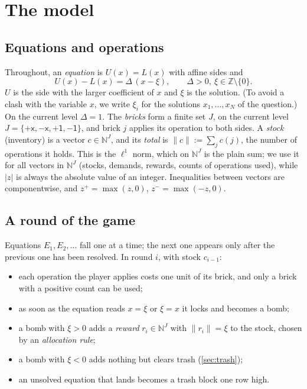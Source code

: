 \documentclass[11pt,a4paper]{article}
\theoremstyle{definition}
\theoremstyle{remark}
\newcommand{\N}{\mathbb{N}}
\newcommand{\Z}{\mathbb{Z}}
\newcommand{\pX}{\ensuremath{\mathord{+}\mathsf{x}}}
\newcommand{\mX}{\ensuremath{\mathord{-}\mathsf{x}}}
\newcommand{\pU}{\ensuremath{\mathord{+}\mathsf{1}}}
\newcommand{\mU}{\ensuremath{\mathord{-}\mathsf{1}}}
\newcommand{\abs}[1]{\lvert #1\rvert}
\newcommand{\norm}[1]{\lVert #1\rVert}
\newcommand{\pos}[1]{{#1}^{+}}
\begin{document}
\section{The model}\label{sec:model}

\subsection{Equations and operations}
Throughout, an \emph{equation} is $U(x)=L(x)$ with affine sides and
\begin{equation}\label{eq:diff}
U(x)-L(x)=\Delta\,(x-\xi),\qquad \Delta>0,\ \xi\in\Z\setminus\{0\}.
\end{equation}
$U$ is the side with the larger coefficient of $x$ and $\xi$ is the solution. (To avoid a
clash with the variable $x$, we write $\xi_i$ for the solutions $x_1,\dots,x_N$ of the
question.) On the current level $\Delta=1$. The \emph{bricks} form a finite set $J$, on
the current level $J=\{\pX,\mX,\pU,\mU\}$, and brick $j$ applies its operation to both
sides. A \emph{stock} (inventory) is a vector $c\in\N^J$, and its \emph{total} is
$\norm{c}:=\sum_j c(j)$, the number of operations it holds. This is the $\ell^1$ norm,
which on $\N^J$ is the plain sum; we use it for all vectors in $\N^J$ (stocks, demands,
rewards, counts of operations used), while $\abs{z}$ is always the absolute value of an
integer.
Inequalities between vectors are componentwise, and $\pos z=\max(z,0)$,
$z^-=\max(-z,0)$.

\subsection{A round of the game}
Equations $E_1,E_2,\dots$ fall one at a time; the next one appears only after the
previous one has been resolved. In round $i$, with stock $c_{i-1}$:
\begin{itemize}[nosep]
\item each operation the player applies costs one unit of its brick, and only a brick with
  a positive count can be used;
\item as soon as the equation reads $x=\xi$ or $\xi=x$ it locks and becomes a bomb;
\item a bomb with $\xi>0$ adds a \emph{reward} $r_i\in\N^J$ with $\norm{r_i}=\xi$ to the
  stock, chosen by an \emph{allocation rule};
\item a bomb with $\xi<0$ adds nothing but clears trash (\cref{sec:trash});
\item an unsolved equation that lands becomes a trash block one row high.
\end{itemize}
\end{document}
